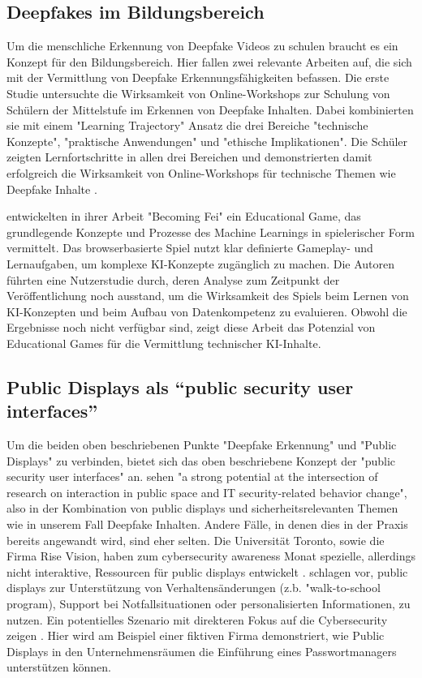 \subsection{Deepfakes im Bildungsbereich}
Um die menschliche Erkennung von Deepfake Videos zu schulen braucht es ein Konzept für den Bildungsbereich.
Hier fallen zwei relevante Arbeiten auf, die sich mit der Vermittlung von Deepfake Erkennungsfähigkeiten befassen.
Die erste Studie untersuchte die Wirksamkeit von Online-Workshops zur Schulung von Schülern der Mittelstufe im Erkennen von Deepfake Inhalten.
Dabei kombinierten sie mit einem "Learning Trajectory" Ansatz die drei Bereiche "technische Konzepte", "praktische Anwendungen" und "ethische Implikationen".
Die Schüler zeigten Lernfortschritte in allen drei Bereichen und demonstrierten damit erfolgreich die Wirksamkeit von Online-Workshops für technische Themen wie Deepfake Inhalte \cite{aliExploringGenerativeModels2021}. 

\textcite{wangBecomingFeiEducational2025} entwickelten in ihrer Arbeit "Becoming Fei" ein Educational Game, 
das grundlegende Konzepte und Prozesse des Machine Learnings in spielerischer Form vermittelt.
Das browserbasierte Spiel nutzt klar definierte Gameplay- und Lernaufgaben, um komplexe KI-Konzepte zugänglich zu machen.
Die Autoren führten eine Nutzerstudie durch, deren Analyse zum Zeitpunkt der Veröffentlichung noch ausstand, 
um die Wirksamkeit des Spiels beim Lernen von KI-Konzepten und beim Aufbau von Datenkompetenz zu evaluieren.
Obwohl die Ergebnisse noch nicht verfügbar sind, zeigt diese Arbeit das Potenzial von Educational Games für die Vermittlung technischer KI-Inhalte.


\subsection{Public Displays als \enquote{public security user interfaces}}
Um die beiden oben beschriebenen Punkte "Deepfake Erkennung" und "Public Displays" zu verbinden, 
bietet sich das oben beschriebene Konzept der "public security user interfaces" an.
\textcite{murtezajPublicSecurityUser2025} sehen "a strong potential at the intersection of research on interaction 
in public space and IT security-related behavior change"\cite[S.59]{murtezajPublicSecurityUser2025}, 
also in der Kombination von public displays und sicherheitsrelevanten Themen wie in unserem Fall Deepfake Inhalten. 
Andere Fälle, in denen dies in der Praxis bereits angewandt wird, sind eher selten. 
Die Universität Toronto, sowie die Firma Rise Vision, haben zum cybersecurity awareness Monat spezielle, 
allerdings nicht interaktive, Ressourcen für public displays entwickelt \cite{visionCyberSecurityAwareness,CyberSecurityAwareness}. 
\textcite{daviesOpenDisplayNetworks2012} schlagen vor, public displays zur Unterstützung von Verhaltensänderungen (z.b. "walk-to-school program), 
Support bei Notfallsituationen oder personalisierten Informationen, zu nutzen. 
Ein potentielles Szenario mit direkteren Fokus auf die Cybersecurity zeigen \textcite{murtezajPublicSecurityUser2025}. 
Hier wird am Beispiel einer fiktiven Firma demonstriert, wie Public Displays in den Unternehmensräumen die Einführung eines Passwortmanagers unterstützen können. 



